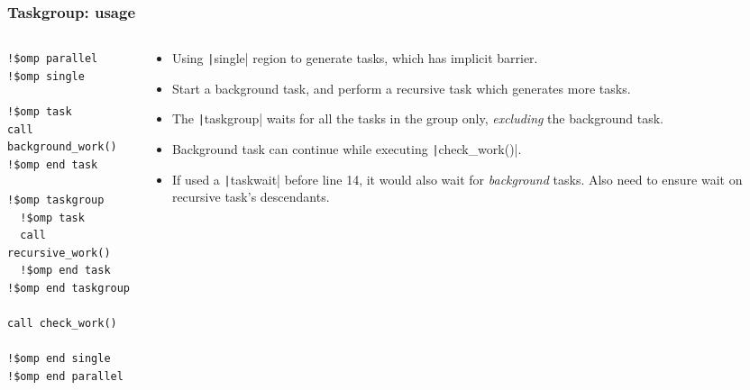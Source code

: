 \documentclass{beamer}
\begin{document}
\begin{frame}[fragile]
\frametitle{Taskgroup: usage}

\begin{columns}
\begin{column}{.4\textwidth}
\begin{verbatim}
!$omp parallel
!$omp single

!$omp task
call background_work()
!$omp end task

!$omp taskgroup
  !$omp task
  call recursive_work()
  !$omp end task
!$omp end taskgroup

call check_work()

!$omp end single
!$omp end parallel
\end{verbatim}
\end{column}

\begin{column}{.6\textwidth}
\begin{itemize}
  \item Using \texttt|single| region to generate tasks, which has implicit barrier.
  \item Start a background task, and perform a recursive task which generates more tasks.
  \item The \texttt|taskgroup| waits for all the tasks in the group only, \emph{excluding} the background task.
  \item Background task can continue while executing \texttt|check_work()|.
  \vfill
  \item If used a \texttt|taskwait| before line 14, it would also wait for \emph{background} tasks. Also need to ensure wait on recursive task's descendants.
\end{itemize}
\end{column}
\end{columns}

\end{frame}

\end{document}
